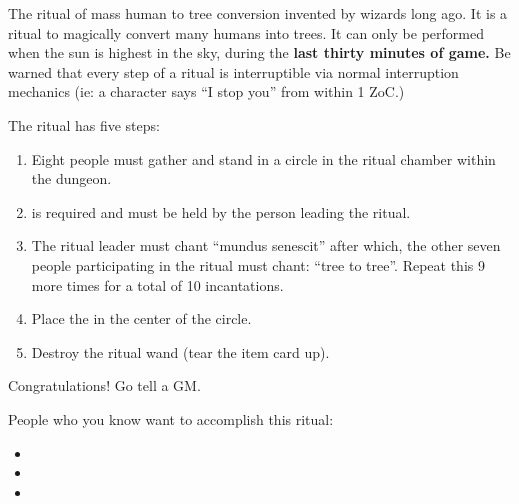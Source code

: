 \documentclass[green]{guildcamp2}
\begin{document}
\name{\gTreeRitual{}}
The ritual of mass human to tree conversion invented by wizards long ago. It is a ritual to magically convert many humans into trees. It can only be performed when the sun is highest in the sky, during the {\bf last thirty minutes of game.} Be warned that every step of a ritual is interruptible via normal interruption mechanics (ie: a character says ``I stop you'' from within 1 ZoC.)

The ritual has five steps: 
\begin{enumerate}
\item Eight people must gather and stand in a circle in the ritual chamber within the dungeon.
\item \iRitualWand{} is required and must be held by the person leading the ritual.
\item The ritual leader must chant ``mundus senescit'' after which, the other seven people participating in the ritual must chant: ``tree to tree''. Repeat this 9 more times for a total of 10 incantations.
\item Place the \iNatureIdol{} in the center of the circle.
\item Destroy the ritual wand (tear the item card up).
\end{enumerate}

Congratulations! Go tell a GM.

People who you know want to accomplish this ritual:
\begin{itemize}
\item \cEnt{}
\item \cTreeFae{}
\item \cTroll{}
\end{itemize}
\end{document}
